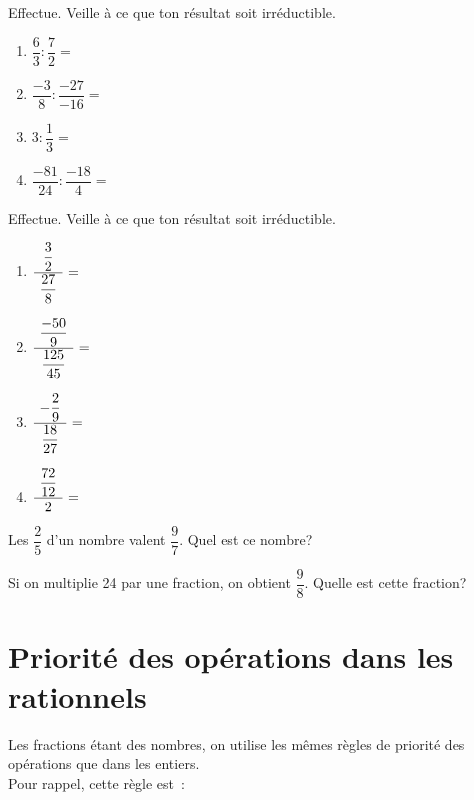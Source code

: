 \documentclass[../math2.tex]{subfiles}
\begin{document}
\vspace{3cm}

\begin{exercise}
  Effectue. Veille à ce que ton résultat soit irréductible.
  \begin{enumerate}[cols=2, itemsep=3cm]
    \item $\dfrac{6}{3} : \dfrac{7}{2}=$
    \item $\dfrac{-3}{8} : \dfrac{-27}{-16}=$
    \item $3 : \dfrac{1}{3}=$
    \item $\dfrac{-81}{24} : \dfrac{-18}{4}=$
  \end{enumerate}
\end{exercise}

\newpage

\begin{exercise}
  Effectue. Veille à ce que ton résultat soit irréductible.
  \begin{enumerate}[cols=2, itemsep=3cm]
    \item $\dfrac{\hspace{4pt}\dfrac{3}{2}\hspace{4pt}}{\hspace{4pt}\dfrac{27}{8}\hspace{4pt}}=$
    \item $\dfrac{\hspace{4pt}\dfrac{-50}{9}\hspace{4pt}}{\hspace{4pt}\dfrac{125}{45}\hspace{4pt}}=$
    \item $\dfrac{\hspace{4pt}-\dfrac{2}{9}\hspace{4pt}}{\hspace{4pt}\dfrac{18}{27}\hspace{4pt}}=$
    \item $\dfrac{\hspace{4pt}\dfrac{72}{12}\hspace{4pt}}{\hspace{4pt}2\hspace{4pt}}=$
  \end{enumerate}
\end{exercise}
\vspace{3cm}

\begin{exercise}
  Les $\dfrac{2}{5}$ d'un nombre valent $\dfrac{9}{7}$. Quel est ce nombre?
\end{exercise}

\vspace{4cm}

\begin{exercise}
  Si on multiplie 24 par une fraction, on obtient $\dfrac{9}{8}$. Quelle est cette fraction?
\end{exercise}

\newpage

\section{Priorité des opérations dans les rationnels}
Les fractions étant des nombres, on utilise les mêmes règles de priorité des opérations que dans les entiers.
\\
Pour rappel, cette règle est~:\vspace*{3cm}
\end{document}
